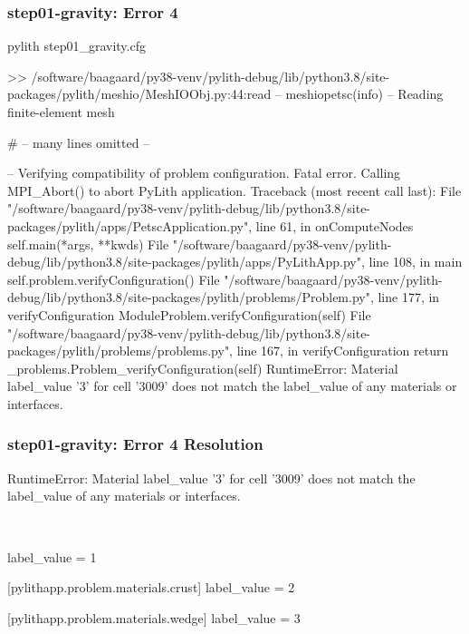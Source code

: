 \documentclass[aspectratio=169]{beamer}
\begin{document}
\begin{frame}[fragile]
  \frametitle{{\ttfamily step01-gravity}: Error 4}

\begin{bashcode}
pylith step01_gravity.cfg

 >> /software/baagaard/py38-venv/pylith-debug/lib/python3.8/site-packages/pylith/meshio/MeshIOObj.py:44:read
 -- meshiopetsc(info)
 -- Reading finite-element mesh

# -- many lines omitted --

 -- Verifying compatibility of problem configuration.
Fatal error. Calling MPI_Abort() to abort PyLith application.
Traceback (most recent call last):
  File "/software/baagaard/py38-venv/pylith-debug/lib/python3.8/site-packages/pylith/apps/PetscApplication.py", line 61, in onComputeNodes
    self.main(*args, **kwds)
  File "/software/baagaard/py38-venv/pylith-debug/lib/python3.8/site-packages/pylith/apps/PyLithApp.py", line 108, in main
    self.problem.verifyConfiguration()
  File "/software/baagaard/py38-venv/pylith-debug/lib/python3.8/site-packages/pylith/problems/Problem.py", line 177, in verifyConfiguration
    ModuleProblem.verifyConfiguration(self)
  File "/software/baagaard/py38-venv/pylith-debug/lib/python3.8/site-packages/pylith/problems/problems.py", line 167, in verifyConfiguration
    return _problems.Problem_verifyConfiguration(self)
RuntimeError: Material label_value '3' for cell '3009' does not match the label_value of any materials or interfaces.
\end{bashcode}

\end{frame}


\begin{frame}[t,fragile]
  \frametitle{{\ttfamily step01-gravity}: Error 4 Resolution}

  \tserror
  \begin{bashcode}
RuntimeError: Material label_value '3' for cell '3009' does not match the label_value of any materials or interfaces.
  \end{bashcode}

  \pause\\[1pt]

  \begin{cfgcode}
    label_value = 1

    [pylithapp.problem.materials.crust]
    label_value = 2

    [pylithapp.problem.materials.wedge]
    label_value = 3
  \end{cfgcode}

\end{frame}
\end{document}
